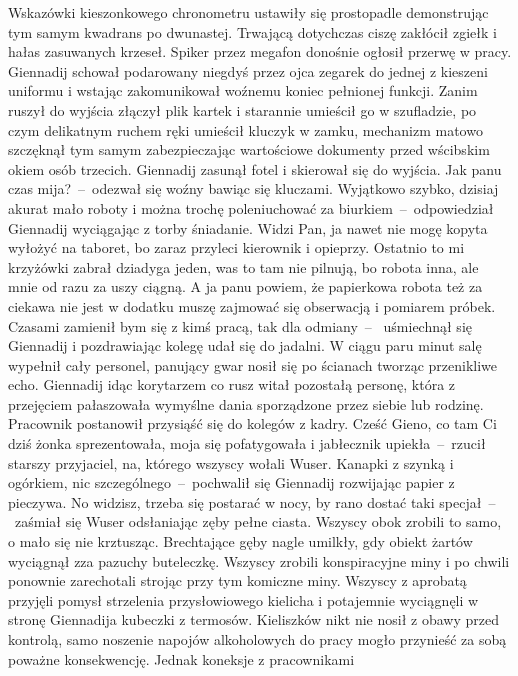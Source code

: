 \documentclass[../MAIN.tex]{subfiles}
\begin{document}
%
Wskazówki kieszonkowego chronometru ustawiły się
prostopadle demonstrując tym samym kwadrans po dwunastej.
Trwającą dotychczas ciszę zakłócił zgiełk i hałas zasuwanych
krzeseł. Spiker przez megafon donośnie ogłosił przerwę w pracy.
Giennadij schował podarowany niegdyś przez ojca zegarek do
jednej z kieszeni uniformu i wstając zakomunikował woźnemu
koniec pełnionej funkcji. Zanim ruszył do wyjścia złączył plik
kartek i starannie umieścił go w szufladzie, po czym delikatnym
ruchem ręki umieścił kluczyk w zamku, mechanizm matowo
szczęknął tym samym zabezpieczając wartościowe dokumenty przed
wścibskim okiem osób trzecich. Giennadij zasunął fotel i
skierował się do wyjścia.
%
\sx Jak panu czas mija?~--~odezwał się woźny bawiąc się
kluczami.
\xx Wyjątkowo szybko, dzisiaj akurat mało roboty i można trochę
poleniuchować za biurkiem~--~odpowiedział Giennadij wyciągając
z torby śniadanie.
\xx Widzi Pan, ja nawet nie mogę kopyta wyłożyć na taboret, bo
zaraz przyleci kierownik i opieprzy. Ostatnio to mi krzyżówki
zabrał dziadyga jeden, was to tam nie pilnują, bo robota inna,
ale mnie od razu za uszy ciągną.
\xx A ja panu powiem, że papierkowa robota też za ciekawa nie
jest w dodatku muszę zajmować się obserwacją i pomiarem próbek.
Czasami zamienił bym się z kimś pracą, tak dla odmiany~--~
uśmiechnął się Giennadij i pozdrawiając kolegę udał się do
jadalni.
\qd
W ciągu paru minut salę wypełnił cały personel, panujący gwar
nosił się po ścianach tworząc przenikliwe echo. Giennadij idąc
korytarzem co rusz witał pozostałą personę, która z przejęciem
pałaszowała wymyślne dania sporządzone przez siebie lub
rodzinę. Pracownik postanowił przysiąść się do kolegów z kadry.
%
\sx Cześć Gieno, co tam Ci dziś żonka sprezentowała, moja się
pofatygowała i jabłecznik upiekła~--~rzucił starszy przyjaciel,
na, którego wszyscy wołali Wuser.
\xx Kanapki z szynką i ogórkiem, nic szczególnego~--~pochwalił
się Giennadij rozwijając papier z pieczywa.
\xx No widzisz, trzeba się postarać w nocy, by rano dostać taki
specjał~--~zaśmiał się Wuser odsłaniając zęby pełne ciasta.
\qd
Wszyscy obok zrobili to samo, o mało się nie krztusząc.
Brechtające gęby nagle umilkły, gdy obiekt żartów wyciągnął zza
pazuchy buteleczkę. Wszyscy zrobili konspiracyjne miny i po
chwili ponownie zarechotali strojąc przy tym komiczne miny.
Wszyscy z aprobatą przyjęli pomysł strzelenia przysłowiowego
kielicha i potajemnie wyciągnęli w stronę Giennadija kubeczki z
termosów. Kieliszków nikt nie nosił z obawy przed kontrolą,
samo noszenie napojów alkoholowych do pracy mogło przynieść za
sobą poważne konsekwencję. Jednak koneksje z pracownikami
\end{document}
